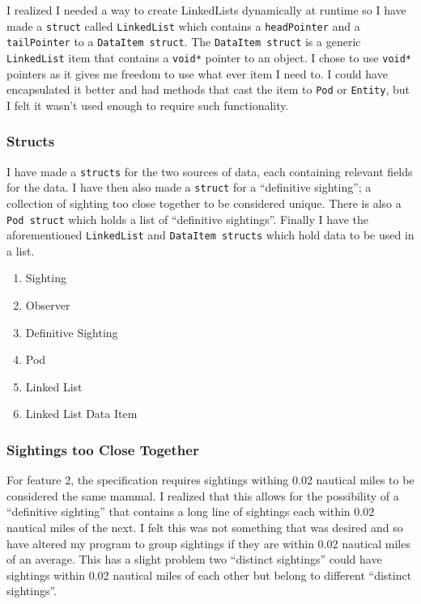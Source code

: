 \documentclass[10pt]{article}
\begin{document}
                I realized I needed a way to create LinkedLists dynamically at runtime so I have made a \texttt{struct} called \texttt{LinkedList} which contains a \texttt{headPointer} and a \texttt{tailPointer} to a \texttt{DataItem struct}. The \texttt{DataItem struct} is a generic \texttt{LinkedList} item that contains a \texttt{void*} pointer to an object. I chose to use \texttt{void*} pointers as it gives me freedom to use what ever item I need to. I could have encapsulated it better and had methods that cast the item to \texttt{Pod} or \texttt{Entity}, but I felt it wasn't used enough to require such functionality. 

            \subsubsection{Structs}
                I have made a \texttt{structs} for the two sources of data, each containing relevant fields for the data. I have then also made a \texttt{struct} for a ``definitive sighting''; a collection of sighting too close together to be considered unique. There is also a \texttt{Pod struct} which holds a list of ``definitive sightings''. Finally I have the aforementioned \texttt{LinkedList} and \texttt{DataItem structs} which hold data to be used in a list. 
                \begin{enumerate}
                    \item Sighting
                    \item Observer
                    \item Definitive Sighting
                    \item Pod
                    \item Linked List
                    \item Linked List Data Item
                \end{enumerate}

            \subsubsection{Sightings too Close Together}
                For feature 2, the specification requires sightings withing 0.02 nautical miles to be considered the same mammal. I realized that this allows for the possibility of a ``definitive sighting'' that contains a long line of sightings each within 0.02 nautical miles of the next. I felt this was not something that was desired and so have altered my program to group sightings if they are within 0.02 nautical miles of an average. This has a slight problem two ``distinct sightings'' could have sightings within 0.02 nautical miles of each other but belong to different ``distinct sightings''.
\end{document}
